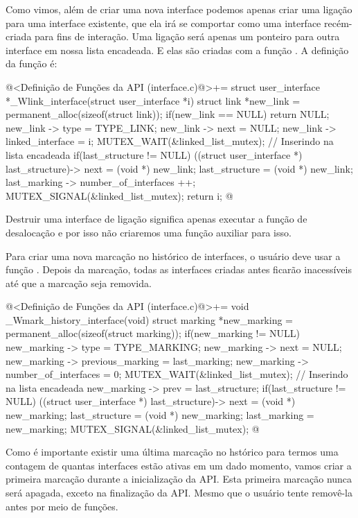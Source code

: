 
Como vimos, além de criar uma nova interface podemos apenas criar uma
ligação para uma interface existente, que ela irá se comportar como
uma interface recém-criada para fins de interação. Uma ligação será
apenas um ponteiro para outra interface em nossa lista encadeada. E
elas são criadas com a função . A
definição da função é:

\iniciocodigo
@<Definição de Funções da API (interface.c)@>+=
struct user_interface *_Wlink_interface(struct user_interface *i){
  struct link *new_link = permanent_alloc(sizeof(struct link));
  if(new_link == NULL)
    return NULL;
  new_link -> type = TYPE_LINK;
  new_link -> next = NULL;
  new_link -> linked_interface = i;
  MUTEX_WAIT(&linked_list_mutex); // Inserindo na lista encadeada
  if(last_structure != NULL)
    ((struct user_interface *) last_structure)-> next = (void *) new_link;
  last_structure = (void *) new_link;
  last_marking -> number_of_interfaces ++;
  MUTEX_SIGNAL(&linked_list_mutex);
  return i;
}
@
\fimcodigo

Destruir uma interface de ligação significa apenas executar a função
de desalocação e por isso não criaremos uma função auxiliar para isso.



Para criar uma nova marcação no histórico de interfaces, o usuário
deve usar a função . Depois da
marcação, todas as interfaces criadas antes ficarão inacessíveis até
que a marcação seja removida.

\iniciocodigo
@<Definição de Funções da API (interface.c)@>+=
void _Wmark_history_interface(void){
  struct marking *new_marking = permanent_alloc(sizeof(struct marking));
  if(new_marking != NULL){
    new_marking -> type = TYPE_MARKING;
    new_marking -> next = NULL;
    new_marking -> previous_marking = last_marking;
    new_marking -> number_of_interfaces = 0;
    MUTEX_WAIT(&linked_list_mutex); // Inserindo na lista encadeada
    new_marking -> prev = last_structure;
    if(last_structure != NULL)
      ((struct user_interface *) last_structure)-> next = (void *) new_marking;
    last_structure = (void *) new_marking;
    last_marking = new_marking;
    MUTEX_SIGNAL(&linked_list_mutex);
  }
}
@
\fimcodigo

Como é importante existir uma última marcação no hstórico para termos
uma contagem de quantas interfaces estão ativas em um dado momento,
vamos criar a primeira marcação durante a inicialização da API. Esta
primeira marcação nunca será apagada, exceto na finalização da
API. Mesmo que o usuário tente removê-la antes por meio de funções.

